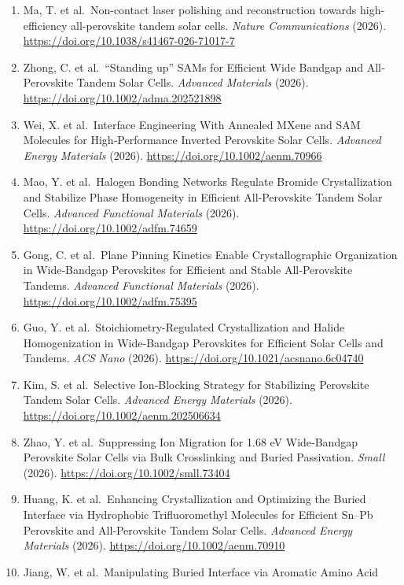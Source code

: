 \documentclass[
  11pt,
]{article}
\begin{document}
\begin{enumerate}
  \url{https://doi.org/10.1021/acsenergylett.6c00227}
\item
  Ma, T. et al.~Non-contact laser polishing and reconstruction towards
  high-efficiency all-perovskite tandem solar cells. \emph{Nature
  Communications} (2026).
  \url{https://doi.org/10.1038/s41467-026-71017-7}
\item
  Zhong, C. et al.~``Standing up'' SAMs for Efficient Wide Bandgap and
  All‐Perovskite Tandem Solar Cells. \emph{Advanced Materials} (2026).
  \url{https://doi.org/10.1002/adma.202521898}
\item
  Wei, X. et al.~Interface Engineering With Annealed MXene and SAM
  Molecules for High‐Performance Inverted Perovskite Solar Cells.
  \emph{Advanced Energy Materials} (2026).
  \url{https://doi.org/10.1002/aenm.70966}
\item
  Mao, Y. et al.~Halogen Bonding Networks Regulate Bromide
  Crystallization and Stabilize Phase Homogeneity in Efficient
  All‐Perovskite Tandem Solar Cells. \emph{Advanced Functional
  Materials} (2026). \url{https://doi.org/10.1002/adfm.74659}
\item
  Gong, C. et al.~Plane Pinning Kinetics Enable Crystallographic
  Organization in Wide‐Bandgap Perovskites for Efficient and Stable
  All‐Perovskite Tandems. \emph{Advanced Functional Materials} (2026).
  \url{https://doi.org/10.1002/adfm.75395}
\item
  Guo, Y. et al.~Stoichiometry-Regulated Crystallization and Halide
  Homogenization in Wide-Bandgap Perovskites for Efficient Solar Cells
  and Tandems. \emph{ACS Nano} (2026).
  \url{https://doi.org/10.1021/acsnano.6c04740}
\item
  Kim, S. et al.~Selective Ion‐Blocking Strategy for Stabilizing
  Perovskite Tandem Solar Cells. \emph{Advanced Energy Materials}
  (2026). \url{https://doi.org/10.1002/aenm.202506634}
\item
  Zhao, Y. et al.~Suppressing Ion Migration for 1.68 eV Wide‐Bandgap
  Perovskite Solar Cells via Bulk Crosslinking and Buried Passivation.
  \emph{Small} (2026). \url{https://doi.org/10.1002/smll.73404}
\item
  Huang, K. et al.~Enhancing Crystallization and Optimizing the Buried
  Interface via Hydrophobic Trifluoromethyl Molecules for Efficient
  Sn--Pb Perovskite and All‐Perovskite Tandem Solar Cells.
  \emph{Advanced Energy Materials} (2026).
  \url{https://doi.org/10.1002/aenm.70910}
\item
  Jiang, W. et al.~Manipulating Buried Interface via Aromatic Amino Acid

\end{enumerate}
\end{document}
